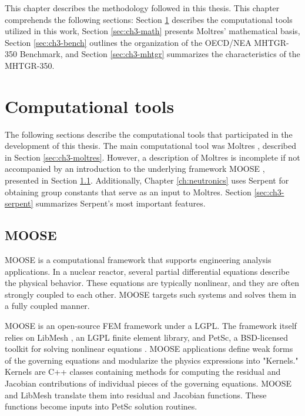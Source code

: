 
This chapter describes the methodology followed in this thesis.
This chapter comprehends the following sections: Section \ref{sec:ch3-tools} describes the computational tools utilized in this work, Section \ref{sec:ch3-math} presents Moltres' mathematical basis, Section \ref{sec:ch3-bench} outlines the organization of the OECD/NEA MHTGR-350 Benchmark, and Section \ref{sec:ch3-mhtgr} summarizes the characteristics of the MHTGR-350.

\section{Computational tools}
\label{sec:ch3-tools}

The following sections describe the computational tools that participated in the development of this thesis.
The main computational tool was Moltres \cite{lindsay_introduction_2018}, described in Section \ref{sec:ch3-moltres}.
However, a description of Moltres is incomplete if not accompanied by an introduction to the underlying framework MOOSE \cite{gaston_moose_2009}, presented in Section \ref{sec:ch3-moose}.
Additionally, Chapter \ref{ch:neutronics} uses Serpent \cite{leppanen_development_2007}\cite{leppanen_calculation_2014} for obtaining group constants that serve as an input to Moltres. Section \ref{sec:ch3-serpent} summarizes Serpent's most important features.

\subsection{MOOSE}
\label{sec:ch3-moose}

MOOSE is a computational framework that supports engineering analysis applications.
In a nuclear reactor, several partial differential equations describe the physical behavior.
These equations are typically nonlinear, and they are often strongly coupled to each other.
\gls{MOOSE} targets such systems and solves them in a fully coupled manner.

\gls{MOOSE} is an open-source FEM framework under a \gls{LGPL}.
The framework itself relies on LibMesh \cite{kirk_libmesh_2006}, an LGPL finite element library, and PetSc, a \gls{BSD}-licensed toolkit for solving nonlinear equations \cite{balay_petsc_2016}.
MOOSE applications define weak forms of the governing equations and modularize the physics expressions into "Kernels."
Kernels are C++ classes containing methods for computing the residual and Jacobian contributions of individual pieces of the governing equations.
\gls{MOOSE} and LibMesh translate them into residual and Jacobian functions.
These functions become inputs into PetSc solution routines.

